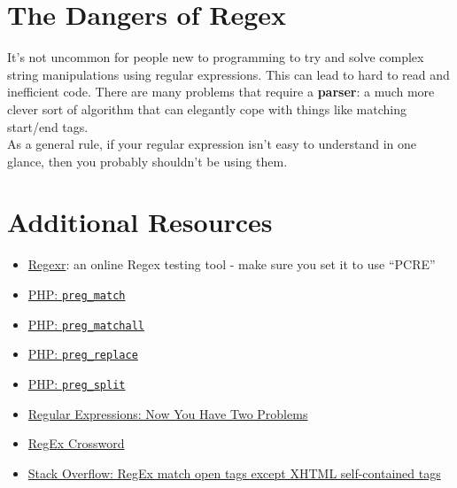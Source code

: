 \section{The Dangers of Regex}


It's not uncommon for people new to programming to try and solve complex string manipulations using regular expressions. This can lead to hard to read and inefficient code. There are many problems that require a \textbf{parser}: a much more clever sort of algorithm that can elegantly cope with things like matching start/end tags.
\\

As a general rule, if your regular expression isn't easy to understand in one glance, then you probably shouldn't be using them.



\section{Additional Resources}

\begin{itemize}[leftmargin=*]
    \item \href{https://regexr.com}{Regexr}: an online Regex testing tool - make sure you set it to use ``PCRE''
    \item \href{http://www.php.net/manual/en/function.preg-match.php}{PHP: \texttt{preg\_match}}
    \item \href{http://www.php.net/manual/en/function.preg-match-all.php}{PHP: \texttt{preg\_matchall}}
    \item \href{http://www.php.net/manual/en/function.preg-replace.php}{PHP: \texttt{preg\_replace}}
    \item \href{http://www.php.net/manual/en/function.preg-split.php}{PHP: \texttt{preg\_split}}
    \item \href{https://blog.codinghorror.com/regular-expressions-now-you-have-two-problems/}{Regular Expressions: Now You Have Two Problems}
    \item \href{http://www.regexcrossword.com/}{RegEx Crossword}
    \item \href{https://stackoverflow.com/a/1732454}{Stack Overflow: RegEx match open tags except XHTML self-contained tags}
\end{itemize}

